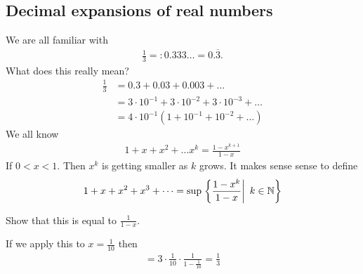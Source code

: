 \subsection{Decimal expansions of real numbers}
We are all familiar with
\begin{align*}
\frac 1 3 =: 0.333\dots = 0. \overline{3}.
\end{align*}
What does this really mean?
\begin{align*}
\frac 1 3 & = 0.3 + 0.03 + 0.003 + \dots \\
& =  3 \cdot 10^{-1} + 3 \cdot 10^{-2} + 3 \cdot 10^{-3} + \dots \\
& = 4 \cdot 10^{-1} \left(1 + 10^{-1} + 10^{-2} + \dots \right)
\end{align*}
We all know
\begin{align*}
1+x+x^2+ \dots x^k = \frac{1-x^{k+1}}{1-x}
\end{align*}
If $0<x<1$. Then $x^k$ is getting smaller as $k$ grows. It makes sense sense to define 
\begin{align*}
1+x+x^2+x^3 + \dots = \sup \left. \left\{ \frac{1-x^k}{1-x} \right|~ k \in \mathbb N \right\}
\end{align*}

\begin{ec}
	Show that this is equal to $\frac 1 {1-x}$.
\end{ec}

If we apply this to $x = \frac 1 {10}$ then 
\begin{align*}
= 3 \cdot \frac 1 {10} \cdot \frac 1 {1- \frac 1 {10}} = \frac 1 3
\end{align*}

